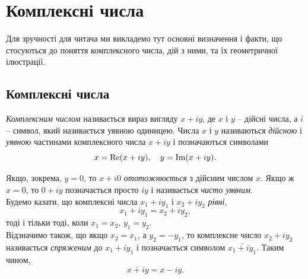 
% 

% 

\setcounter{section}{0}
\section{Комплексні числа}

Для зручності для читача ми викладемо тут основні визначення і факти, що стосуються до поняття комплексного числа, дій з ними, та їх геометричної ілюстрації.

\subsection{Комплексні числа}

\textit{Комплексним числом} називається вираз вигляду $x + iy$, де $x$ і $y$ -- дійсні числа, а $i$ -- символ, який називається уявною одиницею. Числа $x$ і $y$ називаються \textit{дійсною} і \textit{уявною} частинами комплексного числа $x + iy$ і позначаються символами
\begin{equation}
	\label{eq:1.1.1}
	x = \Real(x + i y), \quad y = \Imag(x + i y). %
\end{equation}

Якщо, зокрема, $y = 0$, то $x + i 0$ \textit{ототожнюється} з дійсним числом $x$. Якщо ж $x = 0$, то $0 + i y$ позначається просто $i y$ і називається \textit{чисто уявним}. \\

Будемо казати, що комплексні числа $x_1 + i y_1$ і $x_2 + i y_2$ \textit{рівні},
\begin{equation}
	\label{eq:1.1.2}
	x_1 + i y_1 = x_2 + i y_2,
\end{equation}
тоді і тільки тоді, коли $x_1 = x_2$, $y_1 = y_2$. \\

Відзначимо також, що якщо $x_2 = x_1$, а $y_2 = - y_1$, то комплексне число $x_2 + i y_2$ називається \textit{спряженим} до $x_1 + i y_1$ і позначається символом $\overline{x_1 + i y_1}$. Таким чином,
\begin{equation}
	\label{eq:1.1.3}
	\overline{x + i y} = x - i y.
\end{equation}

